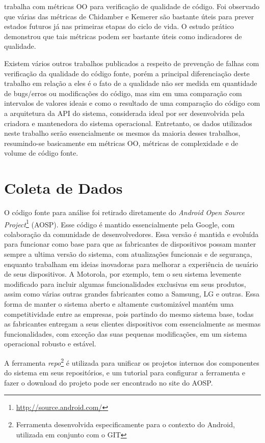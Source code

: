  trabalha com métricas OO para verificação de qualidade de código. Foi observado que várias das métricas de Chidamber e Kemerer são bastante úteis para prever estados futuros já nas primeiras etapas do ciclo de vida. O estudo prático demonstrou que tais métricas podem ser bastante úteis como indicadores de qualidade.

Existem vários outros trabalhos publicados a respeito de prevenção de falhas com verificação da qualidade do código fonte, porém a principal diferenciação deste trabalho em relação a eles é o fato de a qualidade não ser medida em quantidade de bugs/erros ou modificações do código, mas sim em uma comparação com intervalos de valores ideais e como o resultado de uma comparação do código com a arquitetura da API do sistema, considerada ideal por ser desenvolvida pela criadora e mantenedora do sistema operacional. Entretanto, os dados utilizados neste trabalho serão essencialmente os mesmos da maioria desses trabalhos, resumindo-se basicamente em métricas OO, métricas de complexidade e de volume de código fonte. 

\section{Coleta de Dados}

O código fonte para análise foi retirado diretamente do \textit{Android Open Source Project}\footnote{\url{http://source.android.com/}}  (AOSP). Esse código é mantido essencialmente pela Google, com colaboração da comunidade de desenvolvedores. Essa versão é mantida e evoluída para funcionar como base para que as fabricantes de dispositivos possam manter sempre a ultima versão do sistema, com atualizações funcionais e de segurança, enquanto trabalham em ideias inovadoras para melhorar a experiência de usuário de seus dispositivos. A Motorola, por exemplo, tem o seu sistema levemente modificado para incluir algumas funcionalidades exclusivas em seus produtos, assim como várias outras grandes fabricantes como a Samsung, LG e outras.  Essa forma de manter o sistema aberto e altamente customizável mantém uma competitividade entre as empresas, pois partindo do mesmo sistema base, todas as fabricantes entregam a seus clientes dispositivos com essencialmente as mesmas funcionalidades, com exceção das suas pequenas modificações, em um sistema operacional robusto e estável.

A ferramenta \textit{repo}\footnote{Ferramenta desenvolvida especificamente para o contexto do Android, utilizada em conjunto com o GIT}  é utilizada para unificar os projetos internos dos componentes do sistema em seus repositórios, e um tutorial para configurar a ferramenta e fazer o download do projeto pode ser encontrado no site do AOSP.

